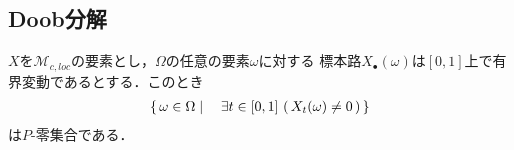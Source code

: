 \subsection{Doob分解}
	
	\begin{screen}
		\begin{thm}[有界変動な局所マルチンゲールは定数]
		\label{thm:local_martingale_of_bounded_variation_is_constant}
			$X$を$\mathscr{M}_{c,loc}$の要素とし，$\Omega$の任意の要素$\omega$に対する
			標本路$X_{\bullet}(\omega)$は$[0,1]$上で有界変動であるとする．このとき
			\begin{align}
				\left\{\, \omega \in \Omega \mid \quad \exists t \in [0,1]\,
				\left(\, X_{t}(\omega) \neq 0\, \right)\, \right\}
			\end{align}
			は$P$-零集合である．
		\end{thm}
	\end{screen}
	
